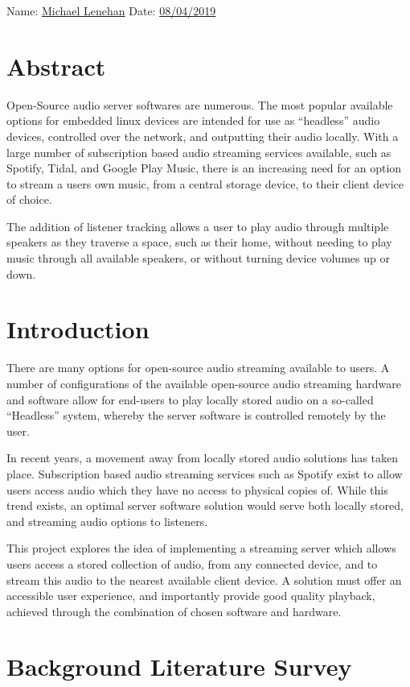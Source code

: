 \documentclass[11pt,a4paper,headinclude=false,footinclude=false]{scrreprt}
\begin{document}
Name: \underline{Michael Lenehan} Date: \underline{08/04/2019}

\chapter{Abstract}\label{abstract}

Open-Source audio server softwares are numerous. The most popular
available options for embedded linux devices are intended for use as
``headless'' audio devices, controlled over the network, and outputting
their audio locally. With a large number of subscription based audio
streaming services available, such as Spotify, Tidal, and Google Play
Music, there is an increasing need for an option to stream a users own
music, from a central storage device, to their client device of choice.

The addition of listener tracking allows a user to play audio through
multiple speakers as they traverse a space, such as their home, without
needing to play music through all available speakers, or without turning
device volumes up or down.

\chapter{Introduction}\label{introduction}

There are many options for open-source audio streaming available to
users. A number of configurations of the available open-source audio
streaming hardware and software allow for end-users to play locally
stored audio on a so-called ``Headless'' system, whereby the server
software is controlled remotely by the user.

In recent years, a movement away from locally stored audio solutions has
taken place. Subscription based audio streaming services such as Spotify
exist to allow users access audio which they have no access to physical
copies of. While this trend exists, an optimal server software solution
would serve both locally stored, and streaming audio options to
listeners.

This project explores the idea of implementing a streaming server which
allows users access a stored collection of audio, from any connected
device, and to stream this audio to the nearest available client device.
A solution must offer an accessible user experience, and importantly
provide good quality playback, achieved through the combination of
chosen software and hardware.

\chapter{Background Literature
Survey}\label{background-literature-survey}
\end{document}
